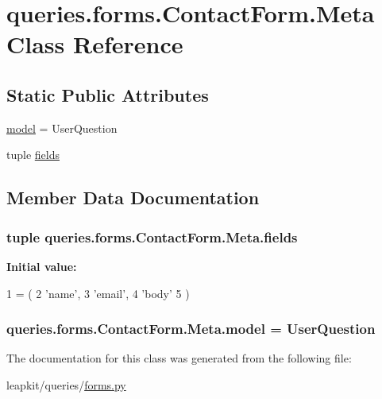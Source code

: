 \hypertarget{classqueries_1_1forms_1_1_contact_form_1_1_meta}{\section{queries.\-forms.\-Contact\-Form.\-Meta Class Reference}
\label{classqueries_1_1forms_1_1_contact_form_1_1_meta}
}
\subsection*{Static Public Attributes}
\begin{DoxyCompactItemize}
\item 
\hyperlink{classqueries_1_1forms_1_1_contact_form_1_1_meta_a579dbeaad6028fff7ee50ff83a5f5b65}{model} = User\-Question
\item 
tuple \hyperlink{classqueries_1_1forms_1_1_contact_form_1_1_meta_ae56cf72db158a0c2acee765d72fb291b}{fields}
\end{DoxyCompactItemize}


\subsection{Member Data Documentation}
\hypertarget{classqueries_1_1forms_1_1_contact_form_1_1_meta_ae56cf72db158a0c2acee765d72fb291b}{
\subsubsection[{fields}]{\setlength{\rightskip}{0pt plus 5cm}tuple queries.\-forms.\-Contact\-Form.\-Meta.\-fields\hspace{0.3cm}{\ttfamily [static]}}}\label{classqueries_1_1forms_1_1_contact_form_1_1_meta_ae56cf72db158a0c2acee765d72fb291b}
{\bfseries Initial value\-:}
\begin{DoxyCode}
1 = (
2             \textcolor{stringliteral}{'name'},
3             \textcolor{stringliteral}{'email'},
4             \textcolor{stringliteral}{'body'}
5         )
\end{DoxyCode}
\hypertarget{classqueries_1_1forms_1_1_contact_form_1_1_meta_a579dbeaad6028fff7ee50ff83a5f5b65}{
\subsubsection[{model}]{\setlength{\rightskip}{0pt plus 5cm}queries.\-forms.\-Contact\-Form.\-Meta.\-model = User\-Question\hspace{0.3cm}{\ttfamily [static]}}}\label{classqueries_1_1forms_1_1_contact_form_1_1_meta_a579dbeaad6028fff7ee50ff83a5f5b65}


The documentation for this class was generated from the following file\-:\begin{DoxyCompactItemize}
\item 
leapkit/queries/\hyperlink{queries_2forms_8py}{forms.\-py}\end{DoxyCompactItemize}

